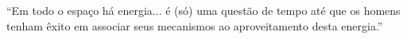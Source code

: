 \begin{epigrafe}
``Em todo o espaço há energia... é (só) uma questão de tempo até que os homens tenham êxito em associar seus mecanismos ao aproveitamento desta energia.''

\begin{autorepigrafe}

{\normalfont \textsc{Nikola Tesla}}}
\end{autorepigrafe}

\end{epigrafe}


\newpage